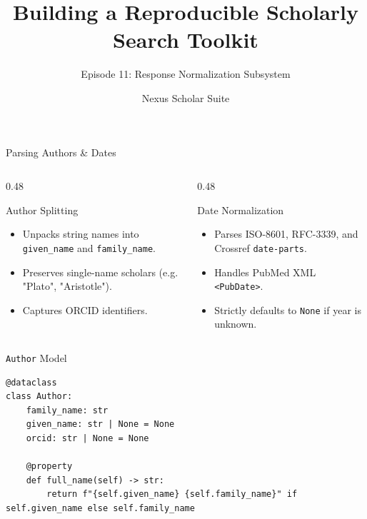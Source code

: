 \documentclass[aspectratio=169]{beamer}
\title{Building a Reproducible Scholarly Search Toolkit}
\subtitle{Episode 11: Response Normalization Subsystem}
\author{Nexus Scholar Suite}
\date{}
\begin{document}
\begin{frame}[plain]
  \titlepage
\end{frame}

\begin{frame}{Parsing Authors \& Dates}
  \begin{columns}[T]
    \begin{column}{0.48\textwidth}
      \begin{block}{Author Splitting}
        \begin{itemize}
          \item Unpacks string names into \texttt{given\_name} and \texttt{family\_name}.
          \item Preserves single-name scholars (e.g. "Plato", "Aristotle").
          \item Captures ORCID identifiers.
        \end{itemize}
      \end{block}
    \end{column}
    \begin{column}{0.48\textwidth}
      \begin{block}{Date Normalization}
        \begin{itemize}
          \item Parses ISO-8601, RFC-3339, and Crossref \texttt{date-parts}.
          \item Handles PubMed XML \texttt{<PubDate>}.
          \item Strictly defaults to \texttt{None} if year is unknown.
        \end{itemize}
      \end{block}
    \end{column}
  \end{columns}
\end{frame}

\begin{frame}[fragile]{\texttt{Author} Model}
\begin{lstlisting}[style=nexuspython]
@dataclass
class Author:
    family_name: str
    given_name: str | None = None
    orcid: str | None = None

    @property
    def full_name(self) -> str:
        return f"{self.given_name} {self.family_name}" if self.given_name else self.family_name
\end{lstlisting}
\end{frame}
\end{document}
